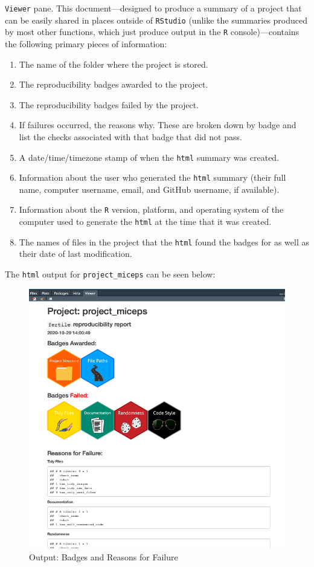 \documentclass[12pt,twoside]{reedthesis}
\providecommand{\tightlist}{%
  \setlength{\itemsep}{0pt}\setlength{\parskip}{0pt}}
\begin{document}
\texttt{Viewer} pane. This document---designed to produce a summary of a
project that can be easily shared in places outside of \texttt{RStudio}
(unlike the summaries produced by most other functions, which just
produce output in the \texttt{R} console)---contains the following
primary pieces of information:
\begin{enumerate}
\def\labelenumi{\arabic{enumi}.}
\tightlist
\item
  The name of the folder where the project is stored.
\item
  The reproducibility badges awarded to the project.
\item
  The reproducibility badges failed by the project.
\item
  If failures occurred, the reasons why. These are broken down by badge
  and list the checks associated with that badge that did not pass.
\item
  A date/time/timezone stamp of when the \texttt{html} summary was
  created.
\item
  Information about the user who generated the \texttt{html} summary
  (their full name, computer username, email, and GitHub username, if
  available).
\item
  Information about the \texttt{R} version, platform, and operating
  system of the computer used to generate the \texttt{html} at the time
  that it was created.
\item
  The names of files in the project that the \texttt{html} found the
  badges for as well as their date of last modification.
\end{enumerate}
The \texttt{html} output for \texttt{project\_miceps} can be seen below:
\begin{figure}
\includegraphics[width=1\linewidth]{figure/badges-1} \caption{Output: Badges and Reasons for Failure}\label{fig:badges-1}
\end{figure}
\end{document}
